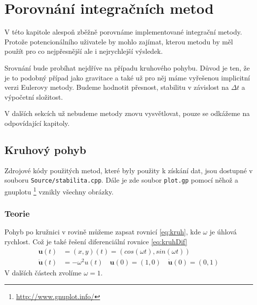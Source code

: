 \chapter{Porovnání integračních metod}
V této kapitole alespoň zběžně porovnáme implementované integrační metody. Protože potencionálního uživatele by mohlo zajímat, kterou metodu by měl použít pro co nejpřesnější ale i nejrychlejší výsledek.

Srovnání bude probíhat nejdříve na případu kruhového pohybu. Důvod je ten, že je to podobný případ jako gravitace a také už pro něj máme vyřešenou implicitní verzi Eulerovy metody. Budeme hodnotit přesnost, stabilitu v závislost na $ \Delta t $ a výpočetní složitost.

V dalších sekcích už nebudeme metody znovu vysvětlovat, pouze se odkážeme na odpovídající kapitoly.

\section{Kruhový pohyb}
Zdrojové kódy použitých metod, které byly použity k získání dat, jsou dostupné v souboru \texttt{Source/stabilita.cpp}. Dále je zde soubor \texttt{plot.gp} pomocí něhož a gnuplotu
\footnote{\url{http://www.gnuplot.info/}}
 vznikly všechny obrázky.
\subsection{Teorie}
Pohyb po kružnici v rovině můžeme zapsat rovnicí \eqref{eq:kruh}, kde $\omega$ je úhlová rychlost. Což je také řešení diferenciální rovnice \eqref{eq:kruhDif}
\begin{align}
\label{eq:kruh}
\boldsymbol{u}(t) &= (x,y)(t)=(cos(\omega t),sin(\omega t))\\
\label{eq:kruhDif}
\ddot{\boldsymbol{u}}(t)&=-\omega^2u(t) \quad \boldsymbol{u}(0)=(1,0) \quad \dot{\boldsymbol{u}}(0)=(0,1)
\end{align}
V dalších částech zvolíme $ \omega = 1 $.
